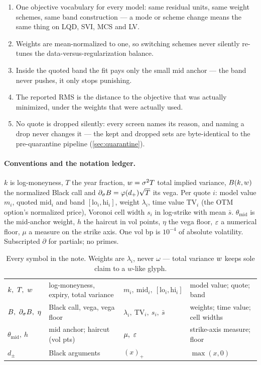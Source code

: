 \documentclass[11pt]{article}
\begin{document}
\begin{invariant}
\begin{enumerate}[leftmargin=1.6em]
\item One objective vocabulary for every model: same residual units, same
weight schemes, same band construction --- a mode or scheme change means
the same thing on LQD, SVI, MCS and LV.
\item Weights are mean-normalized to one, so switching schemes never
silently re-tunes the data-versus-regularization balance.
\item Inside the quoted band the fit pays only the small mid anchor ---
the band never pushes, it only stops punishing.
\item The reported RMS is the distance to the objective that was actually
minimized, under the weights that were actually used.
\item No quote is dropped silently: every screen names its reason, and
naming a drop never changes it --- the kept and dropped sets are
byte-identical to the pre-quarantine pipeline (\cref{sec:quarantine}).
\end{enumerate}
\end{invariant}

\paragraph{Conventions and the notation ledger.}
$k$ is log-moneyness, $T$ the year fraction, $w=\sigma^2T$ total
implied variance, $B(k,w)$ the normalized Black call and
$\partial_\sigma B=\varphi(d_+)\sqrt T$ its vega.  Per quote $i$:
model value $m_i$, quoted $\mathrm{mid}_i$ and band
$[\mathrm{lo}_i,\mathrm{hi}_i]$, weight $\lambda_i$, time value
$\mathrm{TV}_i$ (the OTM option's normalized price), Voronoi cell width
$s_i$ in log-strike with mean $\bar s$.  $\theta_{\mathrm{mid}}$ is the
mid-anchor weight, $h$ the haircut in vol points, $\eta$ the vega floor,
$\varepsilon$ a numerical floor, $\mu$ a measure on the strike axis.  One vol bp
is $10^{-4}$ of absolute volatility.  Subscripted $\partial$ for
partials; no primes.

\begin{table}[H]
\centering\footnotesize
\setlength{\tabcolsep}{4pt}
\begin{tabular}{@{}llll@{}}
\toprule
$k,\ T,\ \tvar$ & log-moneyness, expiry, total variance &
$m_i,\ \mathrm{mid}_i,\ [\mathrm{lo}_i,\mathrm{hi}_i]$ & model value; quote; band\\[2pt]
$\Black,\ \partial_\sigma\Black,\ \eta$ & Black call, vega, vega floor &
$\lambda_i,\ \mathrm{TV}_i,\ s_i,\ \bar s$ & weights; time value; cell widths\\[2pt]
$\theta_{\mathrm{mid}},\ h$ & mid anchor; haircut (vol pts) &
$\mu,\ \eps$ & strike-axis measure; floor\\[2pt]
$d_\pm$ & Black arguments &
$(x)_+$ & $\max(x,0)$\\
\bottomrule
\end{tabular}
\caption{Every symbol in the note.  Weights are $\lambda_i$, never
$\omega$ --- total variance $w$ keeps sole claim to a $w$-like glyph.}
\label{tab:ledger}
\end{table}
\end{document}
